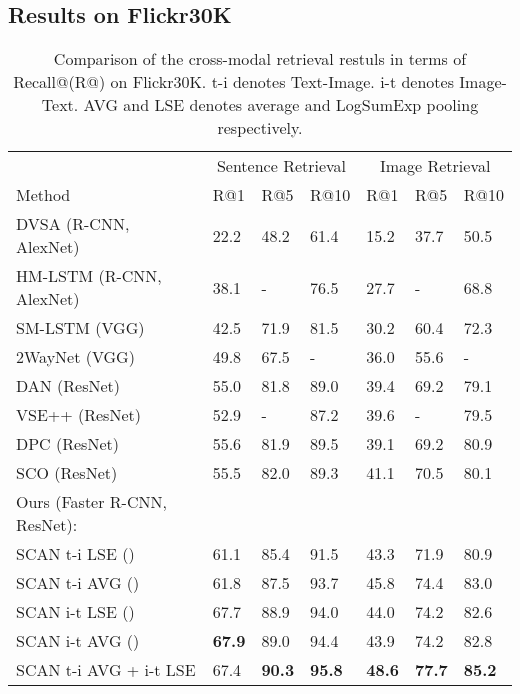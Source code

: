 \documentclass[runningheads]{llncs}
\begin{document}
\subsection{Results on Flickr30K}
\label{sec:res_f30k}

\begin{table}[t!]
\begin{center}
\caption{Comparison of the cross-modal retrieval restuls in terms of Recall@(R@) on Flickr30K. t-i denotes Text-Image. i-t denotes Image-Text. AVG and LSE denotes average and LogSumExp pooling respectively.}
\label{table:flickr30k}
\begin{tabular}
{p{5.0cm}p{1.0cm}p{1.0cm}p{1.0cm}p{1.0cm}p{1.0cm}p{1.0cm}}
\hline\noalign{\smallskip}
 & \multicolumn{3}{c}{Sentence Retrieval} & \multicolumn{3}{c}{Image Retrieval} \\
Method & R@1 & R@5 & R@10 & R@1 & R@5 & R@10 \\
\noalign{\smallskip}
\hline
\noalign{\smallskip}
DVSA (R-CNN, AlexNet) \cite{karpathy2015deep} & 22.2 & 48.2 & 61.4 & 15.2 & 37.7 & 50.5 \\ 
HM-LSTM (R-CNN, AlexNet) \cite{niu2017hierarchical} & 38.1 & - & 76.5 & 27.7 & - & 68.8 \\ 
SM-LSTM (VGG) \cite{huang2017instance} & 42.5 & 71.9 & 81.5 & 30.2 & 60.4 & 72.3 \\ 
2WayNet (VGG) \cite{eisenschtat2017linking} & 49.8 & 67.5 & - & 36.0 & 55.6 & - \\ 
DAN (ResNet) \cite{nam2016dual} & 55.0 & 81.8 & 89.0 & 39.4 & 69.2 & 79.1 \\ 
VSE++ (ResNet) \cite{faghri2017vse++} & 52.9 & - & 87.2 & 39.6 & - & 79.5 \\ 
DPC (ResNet) \cite{zheng2017dual} & 55.6 & 81.9 & 89.5 & 39.1 & 69.2 & 80.9 \\ 
SCO (ResNet) \cite{huang2017learning} & 55.5 & 82.0 & 89.3 & 41.1 & 70.5 & 80.1 \\ 
\hline
Ours (Faster R-CNN, ResNet):  \\ 
SCAN t-i LSE ()  & 61.1 & 85.4 & 91.5 & 43.3 & 71.9 & 80.9  \\ 
SCAN t-i AVG ()  & 61.8 & 87.5 & 93.7 & 45.8 & 74.4 & 83.0  \\ 
SCAN i-t LSE ()   & 67.7 & 88.9 & 94.0 & 44.0 & 74.2 & 82.6 \\ 
 
SCAN i-t AVG () & \textbf{67.9} & 89.0 & 94.4 & 43.9 & 74.2 & 82.8  \\ 
SCAN t-i AVG + i-t LSE  & 67.4  & \textbf{90.3} & \textbf{95.8} & \textbf{48.6} & \textbf{77.7} & \textbf{85.2} \\
\hline
\end{tabular}
\end{center}
\end{table}
\setlength{\tabcolsep}{1.4pt}
\end{document}
